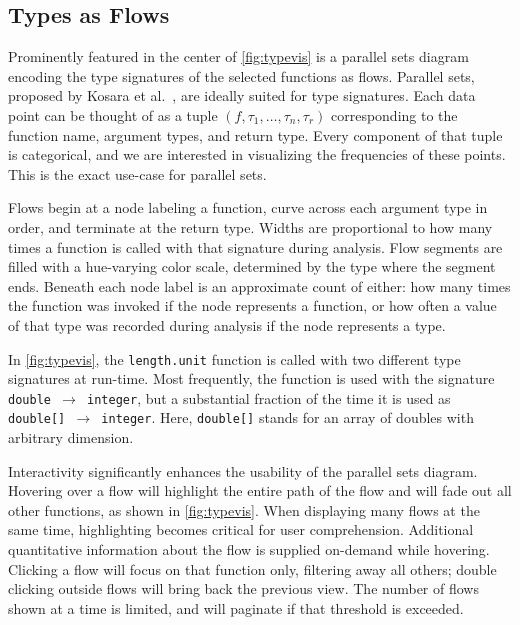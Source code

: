 \documentclass{vgtc}                          %
\begin{document}
\subsection{Types as Flows}

Prominently featured in the center of \cref{fig:typevis} is a parallel sets diagram encoding the type signatures of the selected functions as flows.
Parallel sets, proposed by Kosara et al.~\cite{kosara:2006}, are ideally suited for type signatures.
Each data point can be thought of as a tuple $(f, \tau_1, \ldots, \tau_n, \tau_r)$ corresponding to the function name, argument types, and return type.
Every component of that tuple is categorical, and we are interested in visualizing the frequencies of these points.
This is the exact use-case for parallel sets.

Flows begin at a node labeling a function, curve across each argument type in order, and terminate at the return type.
Widths are proportional to how many times a function is called with that signature during analysis.
Flow segments are filled with a hue-varying color scale, determined by the type where the segment ends.
Beneath each node label is an approximate count of either: how many times the function was invoked if the node represents a function, or how often a value of that type was recorded during analysis if the node represents a type.

In \cref{fig:typevis}, the {\tt length.unit} function is called with two different type signatures at run-time.
Most frequently, the function is used with the signature {\tt double $\to$ integer}, but a substantial fraction of the time it is used as {\tt double[] $\to$ integer}.
Here, {\tt double[]} stands for an array of doubles with arbitrary dimension.

Interactivity significantly enhances the usability of the parallel sets diagram.
Hovering over a flow will highlight the entire path of the flow and will fade out all other functions, as shown in \cref{fig:typevis}.
When displaying many flows at the same time, highlighting becomes critical for user comprehension.
Additional quantitative information about the flow is supplied on-demand while hovering.
Clicking a flow will focus on that function only, filtering away all others; double clicking outside flows will bring back the previous view.
The number of flows shown at a time is limited, and will paginate if that threshold is exceeded.
\end{document}
